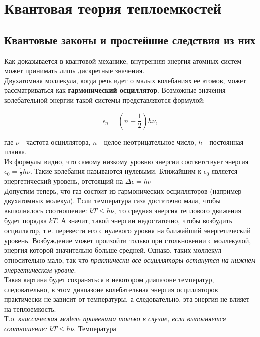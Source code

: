 \section {Квантовая теория теплоемкостей}

\subsection {Квантовые законы и простейшие следствия из них}

Как доказывается в квантовой механике, внутренняя энергия атомных систем может принимать лишь дискретные значения. \\ [0.2cm]

Двухатомная моллекула, когда речь идет о малых колебаниях ее атомов, может рассматриваться как \textbf {гармонический осциллятор}. Возможные значения колебательной энергии такой системы представляются формулой:

\begin{equation}
    \epsilon_n = \left( n + \frac {1}{2} \right) h\nu,
    \label{oscEn}
\end{equation}

где $ \nu $ - частота осциллятора, $ n $ - целое неотрицательное число, $ h $ - постоянная планка. \\ [0.2cm]

Из формулы видно, что самому низкому уровню энергии соответствует энергия $ \epsilon_0 = \frac {1}{2} h\nu $. Такие колебания называются нулевыми. Ближайшим к $ \epsilon_0 $ является энергетический уровень, отстоящий на $ \Delta\epsilon = h\nu $ \\ [0.2cm]

Допустим теперь, что газ состоит из гармонических осцилляторов (например - двухатомных молекул). Если температура газа достаточно мала, чтобы выполнялось соотношение: $ kT \leq h\nu, $ то средняя энергия теплового движения будет порядка $ kT $. А значит, такой энергии недостаточно, чтобы возбудить осциллятор, т.е. перевести его с нулевого уровня на ближайший энергетический уровень. Возбуждение может произойти только при столкновении с моллекулой, энергия которой значительно больше средней. Однако, таких моллекул относительно мало, так что \textit {практически все осцилляторы останутся на нижнем энергетическом уровне}. \\
Такая картина будет сохраняться в некотором диапазоне температур, следовательно, в этом диапазоне колебательная энергия осцилляторов практически не зависит от температуры, а следовательно, эта энергия не влияет на теплоемкость. \\
Т.о. \textit {классическая модель применима только в случае, если выполняется соотношение: $ kT \leq h\nu $}. Температура

